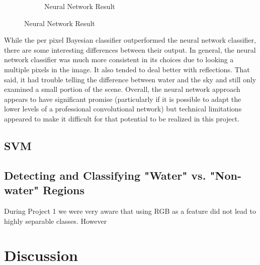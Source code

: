 \documentclass[12pt]{article}
\begin{document}
\begin{figure}
\begin{subfigure}{.33\textwidth}
  \caption{Neural Network Result}
\end{subfigure}%

\end{figure}

	While the per pixel Bayesian classifier outperformed the neural network classifier, there are some interesting differences between their output.  In general, the neural network classifier was much more consistent in its choices due to looking a multiple pixels in the image.  It also tended to deal better with reflections.  That said, it had trouble telling the difference between water and the sky and still only examined a small portion of the scene.  Overall, the neural network approach appears to have significant promise (particularly if it is possible to adapt the lower levels of a professional convolutional network) but technical limitations appeared to make it difficult for that potential to be realized in this project.

	\subsection{SVM}
	\subsection{Detecting and Classifying "Water" vs. "Non-water" Regions}
	During Project 1 we were very aware that using RGB as a feature did not lead to highly separable classes. However


\section{Discussion}


   
\end{document}
